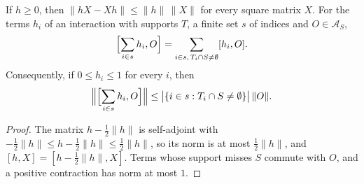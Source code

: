 \begin{theorem}
    \label{thm:positive_contraction_commutator}
    \leanok
    If $h\ge0$, then $\lVert hX-Xh\rVert\le\lVert h\rVert\,\lVert X\rVert$ for every
    square matrix $X$. For the terms $h_i$ of an interaction with supports $T$, a finite
    set $s$ of indices and $O\in\mathcal A_S$,
    \begin{align}
        \Bigl[\sum_{i\in s}h_i,O\Bigr]=\sum_{i\in s,\,T_i\cap S\neq\emptyset}[h_i,O].
    \end{align}
    Consequently, if $0\le h_i\le1$ for every $i$, then
    \begin{align}
        \Bigl\lVert\Bigl[\sum_{i\in s}h_i,O\Bigr]\Bigr\rVert
        \le\bigl|\{i\in s:T_i\cap S\neq\emptyset\}\bigr|\,\lVert O\rVert.
    \end{align}
\end{theorem}
\begin{proof}\leanok
    The matrix $h-\tfrac12\lVert h\rVert$ is self-adjoint with
    $-\tfrac12\lVert h\rVert\le h-\tfrac12\lVert h\rVert\le\tfrac12\lVert h\rVert$, so
    its norm is at most $\tfrac12\lVert h\rVert$, and
    $[h,X]=[h-\tfrac12\lVert h\rVert,X]$. Terms whose support misses $S$ commute with
    $O$, and a positive contraction has norm at most $1$.
\end{proof}

